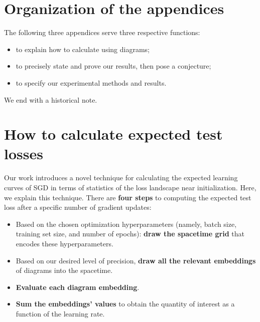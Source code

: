\documentclass{article}
\theoremstyle{plain}
\theoremstyle{definition}
\begin{document}

\newpage
    
    


\clearpage
\newpage
\renewcommand{\thesection}{\Alph{section}}
\setcounter{section}{0}

\section*{Organization of the appendices}
    The following three appendices serve three respective functions:
    \begin{itemize}
        \item to explain how to calculate using diagrams;
        \item to precisely state and prove our results, then pose a conjecture;
        \item to specify our experimental methods and results.
    \end{itemize}
    We end with a historical note.


\section{How to calculate expected test losses}\label{appendix:tutorial}
    Our work introduces a novel technique for calculating the expected learning
    curves of SGD in terms of statistics of the loss landscape near
    initialization.  Here, we explain this technique.  There are {\bf four
    steps} to computing the expected test loss after a specific number of
    gradient updates: 
    \begin{itemize}
        \item Based on the chosen optimization hyperparameters (namely, batch
              size, training set size, and number of epochs):
              {\bf draw the spacetime grid} that encodes these hyperparameters.
        \item Based on our desired level of precision,
              {\bf draw all the relevant embeddings} of diagrams into the
              spacetime.
        \item {\bf Evaluate each diagram embedding}.
        \item {\bf Sum the embeddings' values} to obtain the quantity of
              interest as a function of the learning rate.
    \end{itemize}
\end{document}
